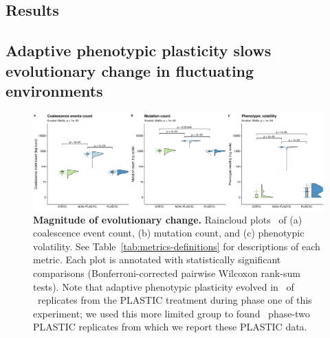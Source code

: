 \begin{raggedbottom}

\section{Results}

\subsection{Adaptive phenotypic plasticity slows evolutionary change in fluctuating environments}

\begin{figure}[h!]
  \centering
  \includegraphics[width=1\textwidth]{05_consequences_of_plasticity/media/media-evolutionary-change-magnitude-panel.pdf}
  \caption{\small
  \textbf{Magnitude of evolutionary change.}
  Raincloud plots~\citep{allen_raincloud_2019} of
  (a) coalescence event count,
  (b) mutation count,
  and (c) phenotypic volatility.
  See Table~\ref{tab:metrics-definitions} for descriptions of each metric.
  Each plot is annotated with statistically significant comparisons (Bonferroni-corrected pairwise Wilcoxon rank-sum tests).
  Note that adaptive phenotypic plasticity evolved in \evolutionaryChangeRatePlasticReps\ of \evolutionaryChangeRateReplicates\ replicates from the PLASTIC treatment during phase one of this experiment; we used this more limited group to found \evolutionaryChangeRatePlasticReps\ phase-two PLASTIC replicates from which we report these PLASTIC data.
  }
  \label{fig:evolutionary-dynamics-magnitude}
\end{figure}




\end{raggedbottom}
